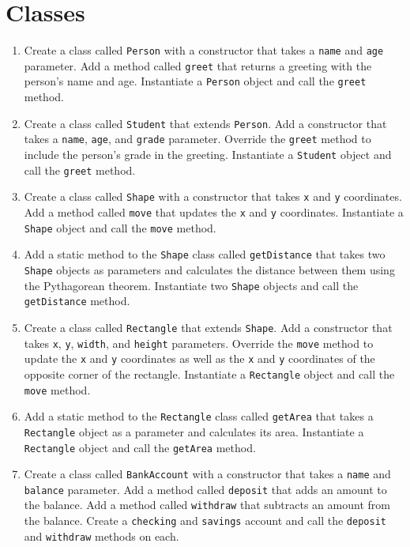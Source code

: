 \documentclass{article}
\begin{document}
\section{Classes}
\begin{enumerate}
	\item Create a class called \verb|Person| with a constructor that takes a \verb|name| and \verb|age| parameter. Add a method called \verb|greet| that returns a greeting with the person's name and age. Instantiate a \verb|Person| object and call the \verb|greet| method.

	\item Create a class called \verb|Student| that extends \verb|Person|. Add a constructor that takes a \verb|name|, \verb|age|, and \verb|grade| parameter. Override the \verb|greet| method to include the person's grade in the greeting. Instantiate a \verb|Student| object and call the \verb|greet| method.
	
	\item Create a class called \verb|Shape| with a constructor that takes \verb|x| and \verb|y| coordinates. Add a method called \verb|move| that updates the \verb|x| and \verb|y| coordinates. Instantiate a \verb|Shape| object and call the \verb|move| method.
	
	\item 	Add a static method to the \verb|Shape| class called \verb|getDistance| that takes two \verb|Shape| objects as parameters and calculates the distance between them using the Pythagorean theorem. Instantiate two \verb|Shape| objects and call the \verb|getDistance| method.
	
	\item Create a class called \verb|Rectangle| that extends \verb|Shape|. Add a constructor that takes \verb|x|, \verb|y|, \verb|width|, and \verb|height| parameters. Override the \verb|move| method to update the \verb|x| and \verb|y| coordinates as well as the \verb|x| and \verb|y| coordinates of the opposite corner of the rectangle. Instantiate a \verb|Rectangle| object and call the \verb|move| method.
	
	\item Add a static method to the \verb|Rectangle| class called \verb|getArea| that takes a \verb|Rectangle| object as a parameter and calculates its area. Instantiate a \verb|Rectangle| object and call the \verb|getArea| method.
	
	\item Create a class called \verb|BankAccount| with a constructor that takes a \verb|name| and \verb|balance| parameter. Add a method called \verb|deposit| that adds an amount to the balance. Add a method called \verb|withdraw| that subtracts an amount from the balance. Create a \verb|checking| and \verb|savings| account and call the \verb|deposit| and \verb|withdraw| methods on each.
	

\end{enumerate}
\end{document}
